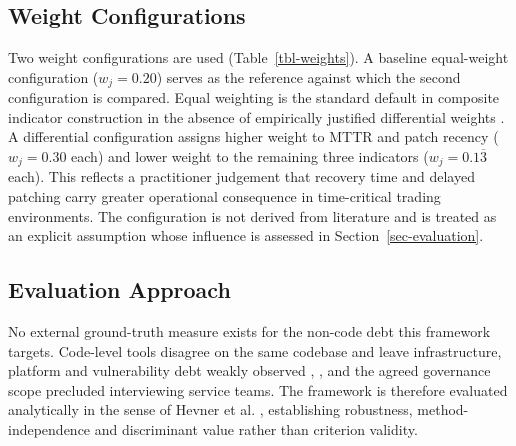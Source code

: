 \documentclass[
  journal,
]{IEEEtran}%
\begin{document}
\subsection{Weight Configurations}\label{weight-configurations}

Two weight configurations are used (Table~\ref{tbl-weights}). A baseline
equal-weight configuration (\(w_j = 0.20\)) serves as the reference
against which the second configuration is compared. Equal weighting is
the standard default in composite indicator construction in the absence
of empirically justified differential weights
. A
differential configuration assigns higher weight to MTTR and patch
recency (\(w_j = 0.30\) each) and lower weight to the remaining three
indicators (\(w_j = 0.1\overline{3}\) each). This reflects a
practitioner judgement that recovery time and delayed patching carry
greater operational consequence in time-critical trading environments.
The configuration is not derived from literature and is treated as an
explicit assumption whose influence is assessed in
Section~\ref{sec-evaluation}.

\begin{table}

\caption{\label{tbl-weights}Weight configurations}


\end{table}%

\subsection{Evaluation Approach}\label{sec-evalapproach}

No external ground-truth measure exists for the non-code debt this
framework targets. Code-level tools disagree on the same codebase
 and
leave infrastructure, platform and vulnerability debt weakly observed
,
, and the
agreed governance scope precluded interviewing service teams. The
framework is therefore evaluated analytically in the sense of Hevner et
al. ,
establishing robustness, method-independence and discriminant value
rather than criterion validity.
\end{document}
